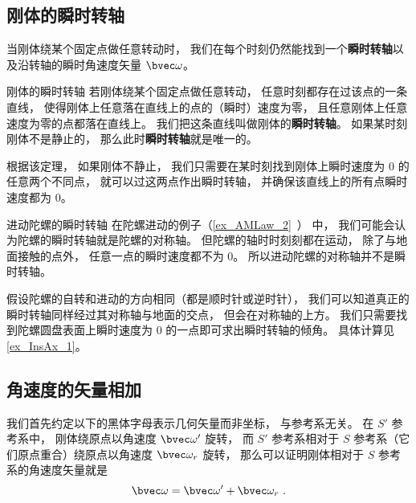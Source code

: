 


\subsection{刚体的瞬时转轴}
当刚体绕某个固定点做任意转动时， 我们在每个时刻仍然能找到一个\textbf{瞬时转轴}以及沿转轴的瞬时角速度矢量 $\bvec \omega$。

\begin{theorem}{刚体的瞬时转轴}
若刚体绕某个固定点做任意转动， 任意时刻都存在过该点的一条直线， 使得刚体上任意落在直线上的点的（瞬时）速度为零， 且任意刚体上任意速度为零的点都落在直线上。 我们把这条直线叫做刚体的\textbf{瞬时转轴}。 如果某时刻刚体不是静止的， 那么此时\textbf{瞬时转轴}就是唯一的。
\end{theorem}
根据该定理， 如果刚体不静止， 我们只需要在某时刻找到刚体上瞬时速度为 0 的任意两个不同点， 就可以过这两点作出瞬时转轴， 并确保该直线上的所有点瞬时速度都为 0。

\begin{example}{进动陀螺的瞬时转轴}\label{ex_InsAx_2}
在陀螺进动的例子（\autoref{ex_AMLaw_2}~） 中， 我们可能会认为陀螺的瞬时转轴就是陀螺的对称轴。 但陀螺的轴时时刻刻都在运动， 除了与地面接触的点外， 任意一点的瞬时速度都不为 0。 所以进动陀螺的对称轴并不是瞬时转轴。

假设陀螺的自转和进动的方向相同（都是顺时针或逆时针）， 我们可以知道真正的瞬时转轴同样经过其对称轴与地面的交点， 但会在对称轴的上方。 我们只需要找到陀螺圆盘表面上瞬时速度为 0 的一点即可求出瞬时转轴的倾角。 具体计算见\autoref{ex_InsAx_1}。
\end{example}

\subsection{角速度的矢量相加}

我们首先约定以下的黑体字母表示几何矢量而非坐标， 与参考系无关。 在 $S'$ 参考系中， 刚体绕原点以角速度 $\bvec \omega'$ 旋转， 而 $S'$ 参考系相对于 $S$ 参考系（它们原点重合）绕原点以角速度 $\bvec \omega_r$ 旋转， 那么可以证明刚体相对于 $S$ 参考系的角速度矢量就是
\begin{equation}\label{eq_InsAx_1}
\bvec \omega = \bvec \omega' + \bvec \omega_r~.
\end{equation}


